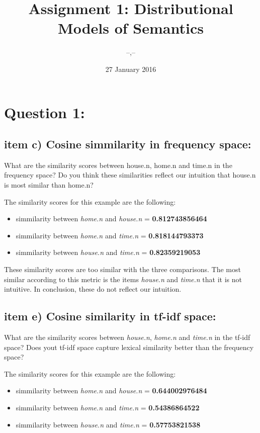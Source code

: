\documentclass{article}
\author{--,--}
\date{27 January 2016}
\title{Assignment 1: Distributional Models of Semantics}
\begin{document}
\maketitle
\section{Question 1:}
\subsection{item c) Cosine simmilarity in frequency space:}
What are the similarity scores between house.n, home.n and time.n in the frequency space? Do you think these similarities reflect our intuition that house.n is most similar than home.n? 

The similarity scores for this example are the following:
\begin{itemize}
\item{simmilarity between \textit{home.n} and \textit{house.n} = \textbf{0.812743856464}}
\item{simmilarity between \textit{home.n} and \textit{time.n} = \textbf{0.818144793373}} 
\item{simmilarity between \textit{house.n} and \textit{time.n} = \textbf{0.82359219053}} 
\end{itemize}

These similarity scores are too similar with the three comparisons. The most similar according to this metric is the items \textit{house.n} and \textit{time.n} that it is not intuitive. In conclusion, these do not reflect our intuition. 

\subsection{item e) Cosine similarity in tf-idf space:}
What are the similarity scores between \textit{house.n}, \textit{home.n} and \textit{time.n} in the tf-idf space? Does yout tf-idf space capture lexical similarity better than the frequency space?

The similarity scores for this example are the following:
\begin{itemize}
\item{simmilarity between \textit{home.n} and \textit{house.n} = \textbf{0.644002976484}}
\item{simmilarity between \textit{home.n} and \textit{time.n} = \textbf{0.54386864522}} 
\item{simmilarity between \textit{house.n} and \textit{time.n} = \textbf{0.57753821538}} 
\end{itemize}
\end{document}
